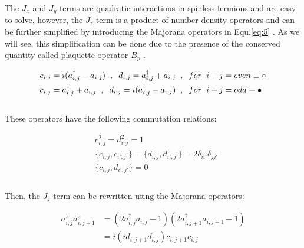 \documentclass{article}
\begin{document}
\noindent The $J_x$ and $J_y$ terms are quadratic interactions in spinless fermions and are easy to solve, however, the $J_z$ term is a product of number density operators and can be further simplified by introducing the Majorana operators in Equ.\hspace{0.2mm}\ref{eq:5} \cite{Schmoll_2017}. As we will see, this simplification can be done due to the presence of the conserved quantity called plaquette operator $B_p$ \cite{Schmoll_2017}. 

\begin{equation}\label{eq:5}
	\begin{aligned}
		c_{i,j} &= i(a^{\dagger}_{i,j} - a_{i,j}) \hspace{2mm},\hspace{2mm} d_{i,j} = a^{\dagger}_{i,j} + a_{i,j} \hspace{2mm},\hspace{2mm} for \hspace{2mm} i+j=even \equiv \circ\\
		c_{i,j} &= a^{\dagger}_{i,j} + a_{i,j} \hspace{2mm},\hspace{2mm} d_{i,j} = i(a^{\dagger}_{i,j} - a_{i,j}) \hspace{2mm},\hspace{2mm} for \hspace{2mm} i+j=odd \equiv \color{black}\bullet\\
	\end{aligned}
\end{equation}\\

\noindent These operators have the following commutation relations:

\begin{equation}\label{eq:6}
	\begin{aligned}
		&c^2_{i,j} = d^2_{i,j} = 1\\
		&\{ c_{i,j},c_{i',j'} \} = \{ d_{i,j},d_{i',j'} \} = 2\delta_{ii'} \delta_{jj'}\\
		&\{ c_{i,j},d_{i',j'} \} = 0\\
	\end{aligned}
\end{equation}\\

\noindent Then, the $J_z$ term can be rewritten using the Majorana operators: 

\begin{equation}\label{eq:7}
	\begin{aligned}
		\sigma^{z}_{i,j}\sigma^{z}_{i,j+1} &=  (2a^{\dagger}_{i,j}a_{i,j} - 1) (2a^{\dagger}_{i,j+1}a_{i,j+1} - 1)\\
		&= i(id_{i,j+1}d_{i,j})c_{i,j+1}c_{i,j} 
	\end{aligned}
\end{equation}\\
\end{document}
